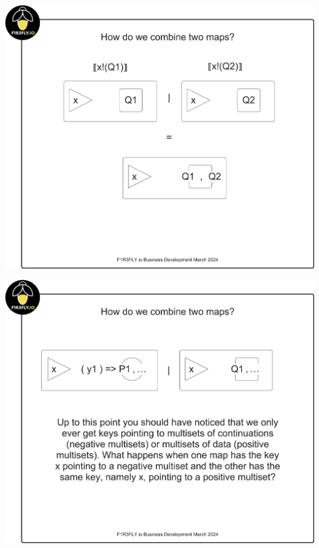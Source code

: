 \includegraphics[scale=0.25]{RHO20RSpaceSlide5.pdf}

\includegraphics[scale=0.25]{RHO20RSpaceSlide6.pdf}

